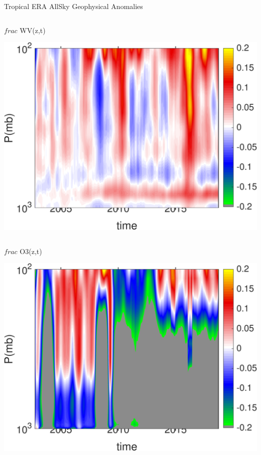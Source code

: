 \documentclass[10pt,t]{beamer}
\begin{document}
\begin{frame}{Tropical ERA AllSky Geophysical Anomalies}
\begin{columns}
\begin{column}{0.45\columnwidth}
\begin{block}{\footnotesize $frac$ WV(z,t)}
\vspace{-0.1in}
\begin{center}
\includegraphics[width=\linewidth]{Figs/CloudAnom/Desc_ocean_orig/era_cld_wv_anom_200209_201808.png}
\end{center}
\end{block}
\end{column}
\end{columns}

\vspace{-0.25in}

\begin{columns}
\begin{column}{0.45\columnwidth}
\begin{block}{\footnotesize $frac$ O3(z,t)}
\vspace{-0.1in}
\begin{center}
\includegraphics[width=\linewidth]{Figs/CloudAnom/Desc_ocean_orig/era_cld_o3_anom_200209_201808.png}
\end{center}
\end{block}
\end{column}


\end{columns}
\end{frame}
\end{document}
